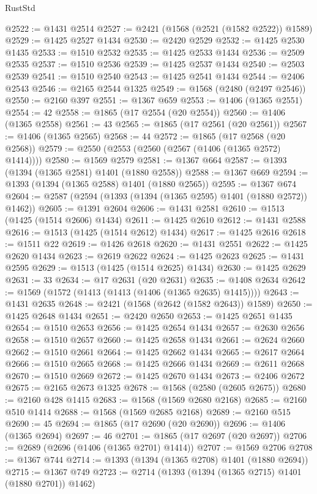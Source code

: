 \begin{lexlean}{RustStd}
\begin{coremodule}
@2522 := @1431 @2514
@2527 := @2421 (@1568 (@2521 (@1582 @2522)) @1589)
@2529 := @1425 @2527 @1434
@2530 := @2420 @2529
@2532 := @1425 @2530 @1435
@2533 := @1510 @2532
@2535 := @1425 @2533 @1434
@2536 := @2509 @2535
@2537 := @1510 @2536
@2539 := @1425 @2537 @1434
@2540 := @2503 @2539
@2541 := @1510 @2540
@2543 := @1425 @2541 @1434
@2544 := @2406 @2543
@2546 := @2165 @2544 @1325
@2549 := @1568 (@2480 (@2497 @2546))
@2550 := @2160 @397
@2551 := @1367 @659
@2553 := @1406 (@1365 @2551)
@2554 := 42
@2558 := @1865 (@17 @2554 (@20 @2554))
@2560 := @1406 (@1365 @2558)
@2561 := 43
@2565 := @1865 (@17 @2561 (@20 @2561))
@2567 := @1406 (@1365 @2565)
@2568 := 44
@2572 := @1865 (@17 @2568 (@20 @2568))
@2579 := @2550 (@2553 (@2560 (@2567 (@1406 (@1365 @2572) @1414))))
@2580 := @1569 @2579
@2581 := @1367 @664
@2587 := @1393 (@1394 (@1365 @2581) @1401 (@1880 @2558))
@2588 := @1367 @669
@2594 := @1393 (@1394 (@1365 @2588) @1401 (@1880 @2565))
@2595 := @1367 @674
@2604 := @2587 (@2594 (@1393 (@1394 (@1365 @2595) @1401 (@1880 @2572)) @1462))
@2605 := @1391 @2604
@2606 := @1431 @2581
@2610 := @1513 (@1425 (@1514 @2606) @1434)
@2611 := @1425 @2610
@2612 := @1431 @2588
@2616 := @1513 (@1425 (@1514 @2612) @1434)
@2617 := @1425 @2616
@2618 := @1511 @22
@2619 := @1426 @2618
@2620 := @1431 @2551
@2622 := @1425 @2620 @1434
@2623 := @2619 @2622
@2624 := @1425 @2623
@2625 := @1431 @2595
@2629 := @1513 (@1425 (@1514 @2625) @1434)
@2630 := @1425 @2629
@2631 := 33
@2634 := @17 @2631 (@20 @2631)
@2635 := @1408 @2634
@2642 := @1569 (@1572 (@1413 (@1413 (@1406 (@1365 @2635) @1415))))
@2643 := @1431 @2635
@2648 := @2421 (@1568 (@2642 (@1582 @2643)) @1589)
@2650 := @1425 @2648 @1434
@2651 := @2420 @2650
@2653 := @1425 @2651 @1435
@2654 := @1510 @2653
@2656 := @1425 @2654 @1434
@2657 := @2630 @2656
@2658 := @1510 @2657
@2660 := @1425 @2658 @1434
@2661 := @2624 @2660
@2662 := @1510 @2661
@2664 := @1425 @2662 @1434
@2665 := @2617 @2664
@2666 := @1510 @2665
@2668 := @1425 @2666 @1434
@2669 := @2611 @2668
@2670 := @1510 @2669
@2672 := @1425 @2670 @1434
@2673 := @2406 @2672
@2675 := @2165 @2673 @1325
@2678 := @1568 (@2580 (@2605 @2675))
@2680 := @2160 @428 @1415
@2683 := @1568 (@1569 @2680 @2168)
@2685 := @2160 @510 @1414
@2688 := @1568 (@1569 @2685 @2168)
@2689 := @2160 @515
@2690 := 45
@2694 := @1865 (@17 @2690 (@20 @2690))
@2696 := @1406 (@1365 @2694)
@2697 := 46
@2701 := @1865 (@17 @2697 (@20 @2697))
@2706 := @2689 (@2696 (@1406 (@1365 @2701) @1414))
@2707 := @1569 @2706
@2708 := @1367 @744
@2714 := @1393 (@1394 (@1365 @2708) @1401 (@1880 @2694))
@2715 := @1367 @749
@2723 := @2714 (@1393 (@1394 (@1365 @2715) @1401 (@1880 @2701)) @1462)

\end{coremodule}
\end{lexlean}
